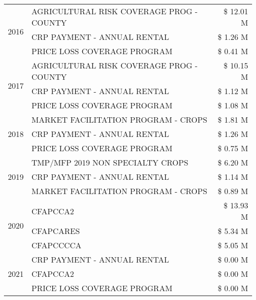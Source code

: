 \begin{tabular}{llr}
\cline{1-3}
\multirow[t]{3}{*}{2016} & AGRICULTURAL RISK COVERAGE PROG - COUNTY & \$ 12.01 M \\
 & CRP PAYMENT - ANNUAL RENTAL & \$ 1.26 M \\
 & PRICE LOSS COVERAGE PROGRAM & \$ 0.41 M \\
\cline{1-3}
\multirow[t]{3}{*}{2017} & AGRICULTURAL RISK COVERAGE PROG - COUNTY & \$ 10.15 M \\
 & CRP PAYMENT - ANNUAL RENTAL & \$ 1.12 M \\
 & PRICE LOSS COVERAGE PROGRAM & \$ 1.08 M \\
\cline{1-3}
\multirow[t]{3}{*}{2018} & MARKET FACILITATION PROGRAM - CROPS & \$ 1.81 M \\
 & CRP PAYMENT - ANNUAL RENTAL & \$ 1.26 M \\
 & PRICE LOSS COVERAGE PROGRAM & \$ 0.75 M \\
\cline{1-3}
\multirow[t]{3}{*}{2019} & TMP/MFP 2019 NON SPECIALTY CROPS & \$ 6.20 M \\
 & CRP PAYMENT - ANNUAL RENTAL & \$ 1.14 M \\
 & MARKET FACILITATION PROGRAM - CROPS & \$ 0.89 M \\
\cline{1-3}
\multirow[t]{3}{*}{2020} & CFAPCCA2 & \$ 13.93 M \\
 & CFAPCARES & \$ 5.34 M \\
 & CFAPCCCCA & \$ 5.05 M \\
\cline{1-3}
\multirow[t]{3}{*}{2021} & CRP PAYMENT - ANNUAL RENTAL & \$ 0.00 M \\
 & CFAPCCA2 & \$ 0.00 M \\
 & PRICE LOSS COVERAGE PROGRAM & \$ 0.00 M \\
\cline{1-3}
\bottomrule
\end{tabular}
